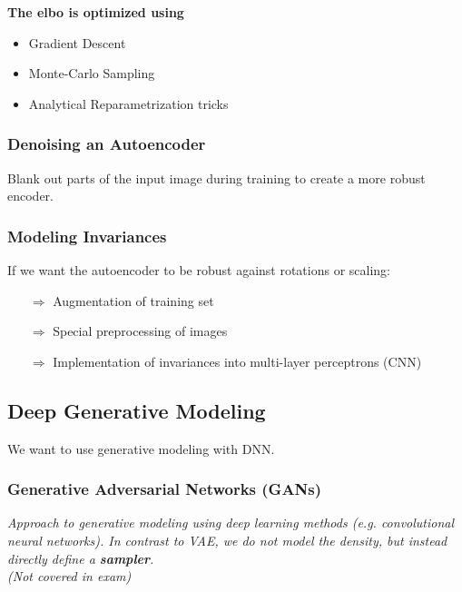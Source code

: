 \textbf{The elbo is optimized using}
\begin{itemize}
	\item Gradient Descent
	\item Monte-Carlo Sampling
	\item Analytical Reparametrization tricks
\end{itemize}


\subsubsection{Denoising an Autoencoder}
Blank out parts of the input image during training to create a more robust encoder.

\subsubsection{Modeling Invariances}
If we want the autoencoder to be robust against rotations or scaling:
\begin{itemize}
	\item[$\Rightarrow$] Augmentation of training set
	\item[$\Rightarrow$] Special preprocessing of images
	\item[$\Rightarrow$] Implementation of invariances into multi-layer perceptrons (CNN) 
\end{itemize}

\subsection{Deep Generative Modeling}
We want to use generative modeling with DNN.


\subsubsection{Generative Adversarial Networks (GANs)}
\textit{Approach to generative modeling using deep learning methods (e.g. convolutional neural networks). In contrast to VAE, we do not model the density, but instead directly define a \textbf{sampler}.}\\
\textit{(Not covered in exam)}

